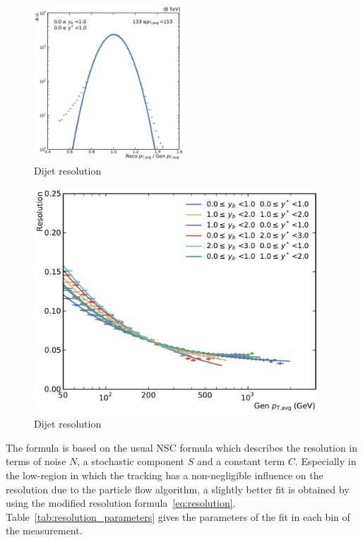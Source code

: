 \begin{figure}[htbp]
    \centering
    \includegraphics[width=0.5\textwidth]{figures/measurement/resolution_yb0ys0_bin10.pdf}
    \caption{Dijet \ptavg resolution}
    \label{fig:resolution_bin}
\end{figure}


\begin{figure}[htbp]
    \centering
    \includegraphics[width=0.95\textwidth]{figures/measurement/resolution_ptavg.pdf}
    \caption{Dijet \ptavg resolution}
    \label{fig:resolution_ptavg}
\end{figure}

The formula is based on the usual NSC formula which describes the resolution in
terms of noise $N$, a stochastic component $S$ and a constant term $C$.
Especially in the low-\pt region in which the tracking has a non-negligible
influence on the resolution due to the particle flow algorithm, a slightly
better fit is obtained by using the modified resolution
formula~\ref{eq:resolution}. Table~\ref{tab:resolution_parameters} gives the
parameters of the fit in each bin of the measurement.

